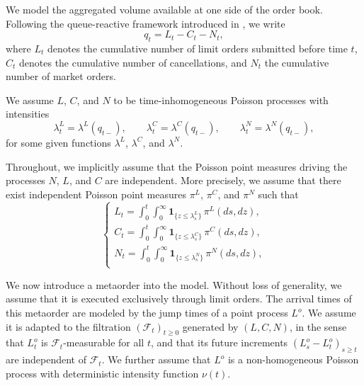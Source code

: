 \documentclass{article} %
\newcommand{\1}{\mathbbm{1}} %
\begin{document}

We model the aggregated volume available at one side of the order book. Following the queue-reactive framework introduced in \cite{huang2015simulating}, we write
\begin{equation}
\label{eq:queue}
q_t = L_t - C_t - N_t,
\end{equation}
where $L_t$ denotes the cumulative number of limit orders submitted before time $t$, $C_t$ denotes the cumulative number of cancellations, and $N_t$ the cumulative number of market orders.

We assume $L$, $C$, and $N$ to be time-inhomogeneous Poisson processes with intensities
\begin{equation*}
\lambda^{L}_t = \lambda^L\!\left(q_{t-}\right), \qquad \lambda^{C}_t = \lambda^C\!\left(q_{t-}\right), \qquad \lambda^{N}_t = \lambda^N\!\left(q_{t-}\right),
\end{equation*}
for some given functions $\lambda^L$, $\lambda^C$, and $\lambda^N$.

Throughout, we implicitly assume that the Poisson point measures driving the processes $N$, $L$, and $C$ are independent. More precisely, we assume that there exist independent Poisson point measures $\pi^{L}$, $\pi^{C}$, and $\pi^{N}$ such that
\begin{equation}
\label{eq:def:pointmeasure}
\begin{cases}
L_t = \displaystyle \int_0^t \int_0^\infty \mathbf{1}_{\{z \leq \lambda^{L}_s\}}\, \pi^{L}(ds,dz), \\[1ex]
C_t = \displaystyle \int_0^t \int_0^\infty \mathbf{1}_{\{z \leq \lambda^{C}_s\}}\, \pi^{C}(ds,dz), \\[1ex]
N_t = \displaystyle \int_0^t \int_0^\infty \mathbf{1}_{\{z \leq \lambda^N_s\}}\, \pi^{N}(ds,dz), \\
\end{cases}
\end{equation}
    
We now introduce a metaorder into the model. 
Without loss of generality, we assume that it is executed exclusively through limit orders.
The arrival times of this metaorder are modeled by the jump times of a point process $L^o$. We assume it is adapted to the filtration $(\mathcal F_t)_{t \ge 0}$ generated by $(L,C,N)$, in the sense that $L^o_t$ is $\mathcal F_t$-measurable for all $t$, and that its future increments $(L^o_s - L^o_t)_{s \ge t}$ are independent of $\mathcal F_t$.
We further assume that $L^o$ is a non-homogeneous Poisson process with deterministic intensity function $\nu(t)$.
\end{document}
